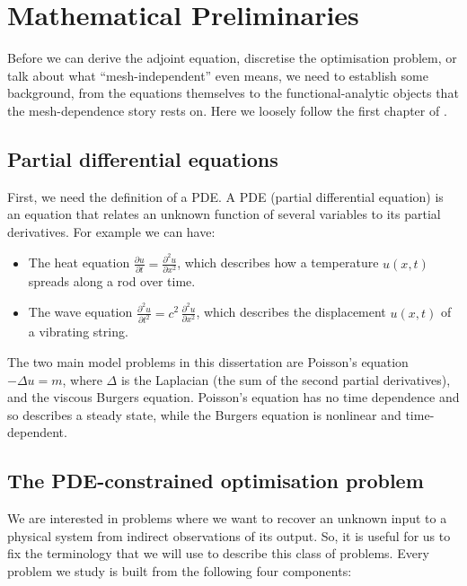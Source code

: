 \documentclass[a4paper,11pt]{article}
\theoremstyle{spacedplain} \newtheorem{theorem}[counter]{Theorem} \newtheorem{lemma}[counter]{Lemma} \newtheorem{prop}[counter]{Proposition} \newtheorem{cor}[counter]{Corollary}
\theoremstyle{spaceddefinition} \newtheorem{defn}[counter]{Definition} \newtheorem{example}[counter]{Example} \newtheorem{remark}[counter]{Remark}
\begin{document}
\section{Mathematical Preliminaries}
\label{sec:preliminaries}

Before we can derive the adjoint equation, discretise the optimisation problem, or talk about what ``mesh-independent'' even means, we need to establish some background, from the equations themselves to the functional-analytic objects that the mesh-dependence story rests on. Here we loosely follow the first chapter of \citet{shfp2017}.

\subsection{Partial differential equations}
\label{sec:prelim:pde}

First, we need the definition of a PDE. A PDE (partial differential equation) is an equation that relates an unknown function of several variables to its partial derivatives. For example we can have: 
\begin{itemize}
\item The heat equation $\frac{\partial u}{\partial t} = \frac{\partial^2 u}{\partial x^2}$, which describes how a temperature $u(x, t)$ spreads along a rod over time.
\item The wave equation $\frac{\partial^2 u}{\partial t^2} = c^2\, \frac{\partial^2 u}{\partial x^2}$, which describes the displacement $u(x, t)$ of a vibrating string.
\end{itemize}

The two main model problems in this dissertation are Poisson's equation $-\Delta u = m$, where $\Delta$ is the Laplacian (the sum of the second partial derivatives), and the viscous Burgers equation. Poisson's equation has no time dependence and so describes a steady state, while the Burgers equation is nonlinear and time-dependent. 

\subsection{The PDE-constrained optimisation problem}
\label{sec:prelim:problem}

We are interested in problems where we want to recover an unknown input to a physical system from indirect observations of its output. So, it is useful for us to fix the terminology that we will use to describe this class of problems. Every problem we study is built from the following four components:
\end{document}
